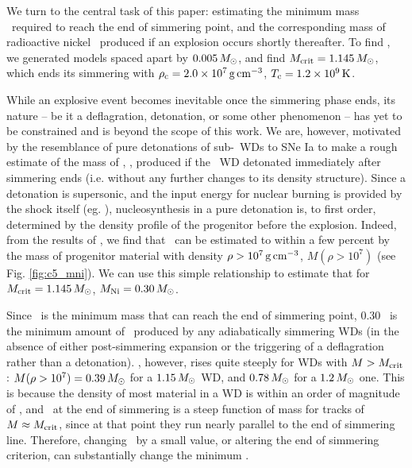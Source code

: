 We turn to the central task of this paper: estimating the minimum mass \Mcrit\ required to reach the end of simmering point, and the corresponding mass of radioactive nickel \MNi\ produced if an explosion occurs shortly thereafter.  To find \Mcrit, we generated models spaced apart by $0.005\,\Msun$, and find $\Mcrit=1.145\,\Msun$, which ends its simmering with $\rhoc = 2.0\times10^7\,\gcc$, $\Tc = 1.2\times10^9\,\mrm{K}$.

While an explosive event becomes inevitable once the simmering phase ends, its nature -- be it a deflagration, detonation, or some other phenomenon -- has yet to be constrained and is beyond the scope of this work.  We are, however, motivated by the resemblance of pure detonations of sub-\Mch\ WDs to SNe Ia to make a rough estimate of the mass of \Ni, \MNi, produced if the \Mcrit\ WD detonated immediately after simmering ends (i.e. without any further changes to its density structure).  Since a detonation is supersonic, and the input energy for nuclear burning is provided by the shock itself (eg. \citealt{seit+09}), nucleosynthesis in a pure detonation is, to first order, determined by the density profile of the progenitor before the explosion.  Indeed, from the results of \cite{sim+10}, we find that \MNi\ can be estimated to within a few percent by the mass of progenitor material with density $\rho>10^7\,\gcc$, $M(\rho>10^7)$ (see Fig. \ref{fig:c5_mni}).  We can use this simple relationship to estimate that for $\Mcrit = 1.145\,\Msun$, $\MNi = 0.30\,\Msun$.  

Since \Mcrit\ is the minimum mass that can reach the end of simmering point, 0.30 \Msun\ is the minimum amount of \Ni\ produced by any adiabatically simmering WDs (in the absence of either post-simmering expansion or the triggering of a deflagration rather than a detonation).  \MNi, however, rises quite steeply for WDs with $M>\Mcrit$: $M(\rho>10^7) = 0.39\,\Msun$ for a $1.15\,\Msun$ WD, and $0.78\,\Msun$ for a $1.2\,\Msun$ one.  This is because the density of most material in a WD is within an order of magnitude of \rhoc, and \rhoc\ at the end of simmering is a steep function of mass for tracks of $M \approx \Mcrit$, since at that point they run nearly parallel to the end of simmering line.  Therefore, changing \Mcrit\ by a small value, or altering the end of simmering criterion, can substantially change the minimum \MNi.


